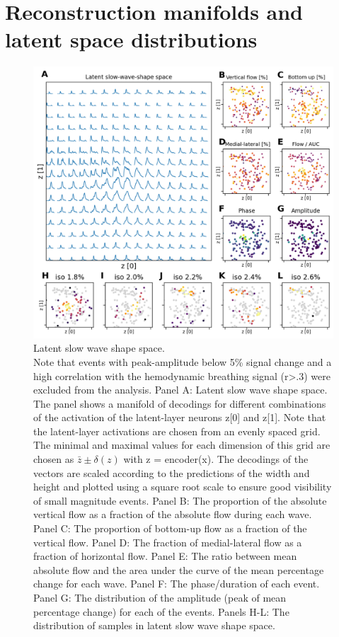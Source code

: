 \section{Reconstruction manifolds and latent space distributions}

\begin{figure}[!htb]
\centering
\includegraphics[width=\textwidth,height=\textheight,keepaspectratio]{Figures/slow_wave_shape_space}
\decoRule
\caption[Latent slow wave shape space]{Latent slow wave shape space.\\Note that events with peak-amplitude below 5\% signal change and a high correlation with the hemodynamic breathing signal (r>.3) were excluded from the analysis. Panel A: Latent slow wave shape space. The panel shows a manifold of decodings for different combinations of the activation of the latent-layer neurons z[0] and z[1]. Note that the latent-layer activations are chosen from an evenly spaced grid. The minimal and maximal values for each dimension of this grid are chosen as $\bar{z}\pm\delta\left(z\right)$ with z = encoder(x). The decodings of the vectors are scaled according to the predictions of the width and height and plotted using a square root scale to ensure good visibility of small magnitude events. Panel B: The proportion of the absolute vertical flow as a fraction of the absolute flow during each wave. Panel C: The proportion of bottom-up flow as a fraction of the vertical flow. Panel D: The fraction of medial-lateral flow as a fraction of horizontal flow. Panel E: The ratio between mean absolute flow and the area under the curve of the mean percentage change for each wave. Panel F: The phase/duration of each event. Panel G: The distribution of the amplitude (peak of mean percentage change) for each of the events. Panels H-L: The distribution of samples in latent slow wave shape space.}
\label{fig:slow_wave_shape_space}
\end{figure}


